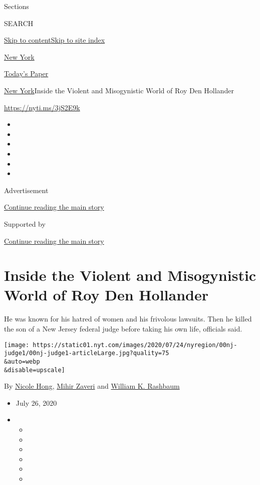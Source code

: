 Sections

SEARCH

\protect\hyperlink{site-content}{Skip to
content}\protect\hyperlink{site-index}{Skip to site index}

\href{https://www.nytimes.com/section/nyregion}{New York}

\href{https://myaccount.nytimes.com/auth/login?response_type=cookie\&client_id=vi}{}

\href{https://www.nytimes.com/section/todayspaper}{Today's Paper}

\href{/section/nyregion}{New York}\textbar{}Inside the Violent and
Misogynistic World of Roy Den Hollander

\url{https://nyti.ms/3jS2E9k}

\begin{itemize}
\item
\item
\item
\item
\item
\item
\end{itemize}

Advertisement

\protect\hyperlink{after-top}{Continue reading the main story}

Supported by

\protect\hyperlink{after-sponsor}{Continue reading the main story}

\hypertarget{inside-the-violent-and-misogynistic-world-of-roy-den-hollander}{%
\section{Inside the Violent and Misogynistic World of Roy Den
Hollander}\label{inside-the-violent-and-misogynistic-world-of-roy-den-hollander}}

He was known for his hatred of women and his frivolous lawsuits. Then he
killed the son of a New Jersey federal judge before taking his own life,
officials said.

\texttt{[image: https://static01.nyt.com/images/2020/07/24/nyregion/00nj-judge1/00nj-judge1-articleLarge.jpg?quality=75\\\&auto=webp\\\&disable=upscale]}

By \href{https://www.nytimes.com/by/nicole-hong}{Nicole Hong},
\href{https://www.nytimes.com/by/mihir-zaveri}{Mihir Zaveri} and
\href{https://www.nytimes.com/by/william-k-rashbaum}{William K.
Rashbaum}

\begin{itemize}
\item
  July 26, 2020
\item
  \begin{itemize}
  \item
  \item
  \item
  \item
  \item
  \item
  \end{itemize}
\end{itemize}

